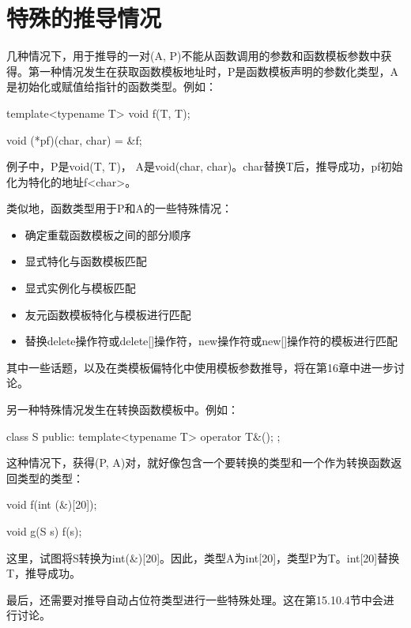 \section{特殊的推导情况}
几种情况下，用于推导的一对(A, P)不能从函数调用的参数和函数模板参数中获得。第一种情况发生在获取函数模板地址时，P是函数模板声明的参数化类型，A是初始化或赋值给指针的函数类型。例如：

\begin{cpp}
template<typename T>
void f(T, T);

void (*pf)(char, char) = &f;
\end{cpp}

例子中，P是void(T, T)， A是void(char, char)。char替换T后，推导成功，pf初始化为特化的地址f<char>。

类似地，函数类型用于P和A的一些特殊情况：

\begin{itemize}
\item 
确定重载函数模板之间的部分顺序

\item 
显式特化与函数模板匹配

\item 
显式实例化与模板匹配

\item 
友元函数模板特化与模板进行匹配

\item 
替换delete操作符或delete[]操作符，new操作符或new[]操作符的模板进行匹配
\end{itemize}

其中一些话题，以及在类模板偏特化中使用模板参数推导，将在第16章中进一步讨论。

另一种特殊情况发生在转换函数模板中。例如：

\begin{cpp}
class S {
	public:
	template<typename T> operator T&();
};
\end{cpp}

这种情况下，获得(P, A)对，就好像包含一个要转换的类型和一个作为转换函数返回类型的类型：

\begin{cpp}
void f(int (&)[20]);

void g(S s) {
	f(s);
}
\end{cpp}

这里，试图将S转换为int(\&)[20]。因此，类型A为int[20]，类型P为T。int[20]替换T，推导成功。

最后，还需要对推导自动占位符类型进行一些特殊处理。这在第15.10.4节中会进行讨论。


































